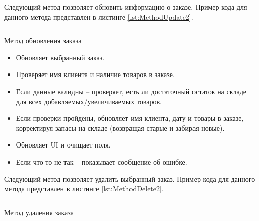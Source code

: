 \documentclass[12pt]{article}
\newcommand{\colorGIT}[1]{\textcolor{CtpLavender}{#1}}
\renewcommand{\texttt}[1]{{\small\ttfamily #1}}
\newenvironment{code}{\captionsetup{type=listing}}{}
\numberwithin{listing}{section}
\numberwithin{figure}{section}
\begin{document}
Следующий метод позволяет обновить информацию о заказе. Пример кода для данного метода представлен в листинге \ref{lst:MethodUpdate2}.

\begin{code}
	\inputminted[firstline=218, lastline=266]{csharp}{../../3lab/StoreManager/MainWindow.xaml.cs}
	\caption{\colorGIT{\href{https://github.com/WebMasterIT/Csharp_Labs/blob/ec375afd16c0647b337cf3d8a79c8bef904fc1be/3lab/StoreManager/MainWindow.xaml.cs\#L218-L266}{Метод}} обновления заказа}
	\label{lst:MethodUpdate2}
\end{code}

\begin{itemize}
	\item Обновляет выбранный заказ.
	\item Проверяет имя клиента и наличие товаров в заказе.
	\item Если данные валидны -- проверяет, есть ли достаточный остаток на складе для всех добавляемых/увеличиваемых товаров.
	\item Если проверки пройдены, обновляет имя клиента, дату и товары в заказе, корректируя запасы на складе (возвращая старые и забирая новые).
	\item Обновляет \texttt{UI} и очищает поля.
	\item Если что-то не так -- показывает сообщение об ошибке.
\end{itemize}

Следующий метод позволяет удалить выбранный заказ. Пример кода для данного метода представлен в листинге \ref{lst:MethodDelete2}.

\begin{code}
	\inputminted[firstline=268, lastline=295]{csharp}{../../3lab/StoreManager/MainWindow.xaml.cs}
	\caption{\colorGIT{\href{https://github.com/WebMasterIT/Csharp_Labs/blob/ec375afd16c0647b337cf3d8a79c8bef904fc1be/3lab/StoreManager/MainWindow.xaml.cs\#L268-L295}{Метод}} удаления заказа}
	\label{lst:MethodDelete2}
\end{code}
\end{document}
